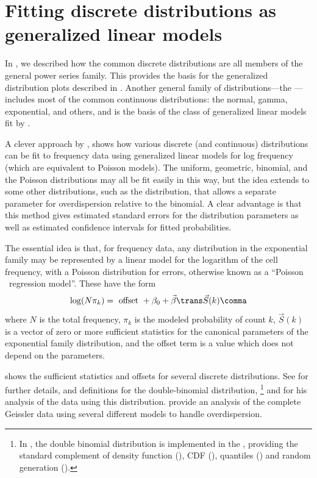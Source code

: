 \documentclass[11pt]{book}\usepackage[]{graphicx}\usepackage[]{color}
\begin{document}
\section{Fitting discrete distributions as generalized linear models}\label{sec:fitglm}

In , we described how the common discrete distributions
are all members of the general power series family.  This provides the
basis for the generalized distribution plots described in .
Another general family of distributions---the ---%
includes most of the common continuous distributions:
the normal, gamma, exponential, and others,
and is the basis of the class of generalized linear models fit
by .

A clever approach by
\citet{LindseyMersch:92}, \citet[\S 6.1]{Lindsey:95} shows how various discrete
(and continuous)
distributions can be fit to frequency data using generalized linear models
for log frequency (which are equivalent to Poisson \loglin models).
The uniform, geometric, binomial, and the
Poisson distributions may all be fit easily in this way, but the idea extends
to some other distributions, such as the  distribution,
that allows a separate parameter for overdispersion relative to the binomial.
A clear advantage is that this method gives estimated standard errors for the
distribution parameters as well as estimated confidence intervals
for fitted probabilities.

The essential idea is that, for frequency data, any distribution in the
exponential family may be represented by a linear model for the logarithm
of the cell frequency, with a Poisson distribution for errors,
otherwise known as a ``Poisson \loglin\ regression model''.
These have the form
\begin{equation*}
\log (N \pi_k) = \textrm{ offset } + \beta_0 + \vec{\beta}\trans \vec{S}(k)
 \comma
\end{equation*}
where $N$ is the total frequency, $\pi_k$ is the modeled probability
of count $k$, 
$\vec{S}(k)$ is a vector of zero or more sufficient statistics for the
canonical parameters of the exponential family distribution,
and the offset term is a value which does not depend on the
parameters.  

 shows the sufficient statistics and
offsets for several discrete distributions.
See \citet{LindseyMersch:92} for further details, and definitions
for the double-binomial distribution,%
\footnote{
In \R, the double binomial distribution is implemented in the 
, providing the standard complement of
density function (), CDF (),
quantiles ()
and random generation ().
}
and \citet[pp. 130--133]{Lindsey:95}
for his analysis of the  data using this distribution.
\citet{LindseyAltham:1998} provide an analysis of the 
complete Geissler data using several different models to
handle overdispersion.

\end{document}

